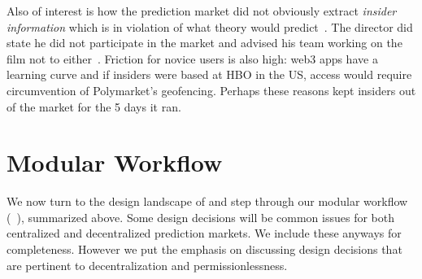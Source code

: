 Also of interest is how the prediction market did not obviously extract \textit{insider information} which is in violation of what theory would predict~\cite{Han07}. The director did state he did not participate in the market and advised his team working on the film not to either~\cite{Beg24}. Friction for novice users is also high: web3 apps have a learning curve and if insiders were based at HBO in the US, access would require circumvention of Polymarket's geofencing. Perhaps these reasons kept insiders out of the market for the 5 days it ran.


\section{Modular Workflow}
\label{sec:wf}

\begin{center}
\end{center}


We now turn to the design landscape of \depms and step through our modular workflow (\cf~\cite{ClEsGS21}), summarized above. Some design decisions will be common issues for both centralized and decentralized prediction markets. We include these anyways for completeness. However we put the emphasis on discussing design decisions that are pertinent to decentralization and permissionlessness.

